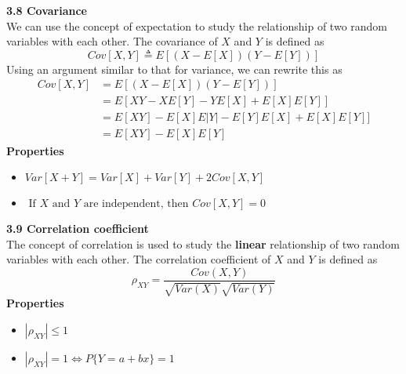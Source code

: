 \documentclass[10pt,a4paper,oneside]{beamer}
\begin{document}
\begin{frame}
\vspace{0.3cm}
{\bfseries 3.8 Covariance} 
\vspace{0.5cm}
\\We can use the concept of expectation to study the relationship of two random variables with each other. The covariance of $X$ and $Y$ is defined as
\[
Cov[X, Y] \triangleq E[(X-E[X])(Y-E[Y])]
\]
Using an argument similar to that for variance, we can rewrite this as
\[
\begin{aligned} {Cov}[X, Y] &=E[(X-E[X])(Y-E[Y])] \\ &=E[X Y-X E[Y]-Y E[X]+E[X] E[Y]] \\ &=E[X Y]-E[X] E|Y|-E[Y] E[X]+E[X] E[Y] ] \\ &=E[X Y]-E[X] E[Y] \end{aligned}
\]
{\bfseries Properties}
\vspace{0.3cm}
\begin{itemize}
	\item $Var[X+Y]=Var[X]+Var[Y]+2 Cov[X, Y]$
	\item $\text { If } X \text { and } Y \text { are independent, then } Cov[X, Y]=0$
\end{itemize} 
\end{frame}
\begin{frame}
\vspace{0.3cm}
{\bfseries 3.9 Correlation coefficient} 
 \vspace{0.5cm}
\\The concept of correlation is used to study the {\bfseries linear} relationship of two random variables with each other. The correlation coefficient of $X$ and $Y$ is defined as
\[
\rho_{XY}=\frac{Cov(X,Y)}{\sqrt{Var(X)}\sqrt{Var(Y)}}
\]
{\bfseries Properties}
\vspace{0.3cm}
\begin{itemize}
	\item $|\rho_{XY}|\leqslant1$
	\item $|\rho_{XY}|=1\Leftrightarrow P\{Y=a+bx\}=1$
\end{itemize} 
\end{frame}
\end{document}
